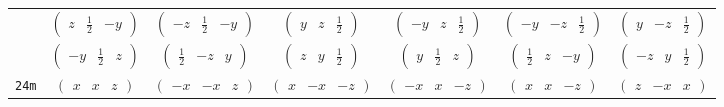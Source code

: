 \documentclass[fleqn,9pt,landscape]{jsarticle}
\begin{document}
\begin{center}
\begin{longtable}{ccccccc}
& $ \begin{pmatrix} z & \frac{1}{2} & - y \end{pmatrix} $ & $ \begin{pmatrix} - z & \frac{1}{2} & - y \end{pmatrix} $ & $ \begin{pmatrix} y & z & \frac{1}{2} \end{pmatrix} $ & $ \begin{pmatrix} - y & z & \frac{1}{2} \end{pmatrix} $ & $ \begin{pmatrix} - y & - z & \frac{1}{2} \end{pmatrix} $ & $ \begin{pmatrix} y & - z & \frac{1}{2} \end{pmatrix} $ \\
& $ \begin{pmatrix} - y & \frac{1}{2} & z \end{pmatrix} $ & $ \begin{pmatrix} \frac{1}{2} & - z & y \end{pmatrix} $ & $ \begin{pmatrix} z & y & \frac{1}{2} \end{pmatrix} $ & $ \begin{pmatrix} y & \frac{1}{2} & z \end{pmatrix} $ & $ \begin{pmatrix} \frac{1}{2} & z & - y \end{pmatrix} $ & $ \begin{pmatrix} - z & y & \frac{1}{2} \end{pmatrix} $ \\ \hline
{\tt 24m} & $ \begin{pmatrix} x & x & z \end{pmatrix} $ & $ \begin{pmatrix} - x & - x & z \end{pmatrix} $ & $ \begin{pmatrix} x & - x & - z \end{pmatrix} $ & $ \begin{pmatrix} - x & x & - z \end{pmatrix} $ & $ \begin{pmatrix} x & x & - z \end{pmatrix} $ & $ \begin{pmatrix} z & - x & x \end{pmatrix} $ \\

\end{longtable}
\end{center}
\end{document}
